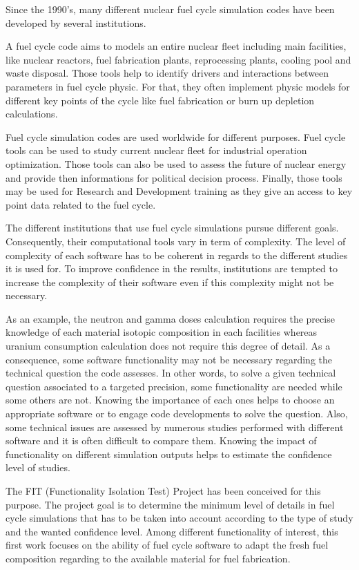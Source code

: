 Since the 1990's, many different nuclear fuel cycle simulation codes have been developed by several institutions.

A fuel cycle code aims to models an entire nuclear fleet including main facilities, like nuclear reactors, fuel fabrication plants, reprocessing plants, cooling pool and waste disposal. Those tools help to identify drivers and interactions between parameters in fuel cycle physic. For that, they often implement physic models for different key points of the cycle like fuel fabrication or burn up depletion calculations. 

Fuel cycle simulation codes are used worldwide for different purposes. Fuel cycle tools can be used to study current nuclear fleet for industrial operation optimization. Those tools can also be used to assess the future of nuclear energy and provide then informations for political decision process. Finally, those tools may be used for Research and Development training as they give an access to key point data related to the fuel cycle. 

The different institutions that use fuel cycle simulations pursue different goals. Consequently, their computational tools vary in term of complexity. The level of complexity of each software has to be coherent in regards to the different studies it is used for. To improve confidence in the results, institutions are tempted to increase the complexity of their software even if this complexity might not be necessary.

As an example, the neutron and gamma doses calculation requires the precise knowledge of each material isotopic composition in each facilities whereas uranium consumption calculation does not require this degree of detail. As a consequence, some software functionality may not be necessary regarding the technical question the code assesses. In other words, to solve a given technical question associated to a targeted precision, some functionality are needed while some others are not. Knowing the importance of each ones helps to choose an appropriate software or to engage code developments to solve the question. Also, some technical issues are assessed by numerous studies performed with different software and it is often difficult to compare them. Knowing the impact of functionality on different simulation outputs helps to estimate the confidence level of studies.

The FIT (Functionality Isolation Test) Project has been conceived for this purpose. The project goal is to determine the minimum level of details in fuel cycle simulations that has to be taken into account according to the type of study and the wanted confidence level. Among different functionality of interest, this first work focuses on the ability of fuel cycle software to adapt the fresh fuel composition regarding to the available material for fuel fabrication.


